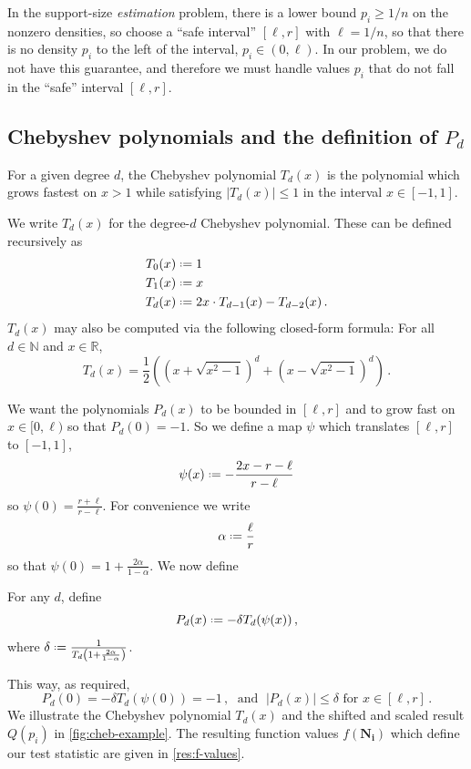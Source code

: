 \documentclass{theoretics}
\newcommand*{\define}{\mathrel{\vcenter{\baselineskip0.5ex \lineskiplimit0pt
                      \hbox{\scriptsize.}\hbox{\scriptsize.}}}%
                      =}
\newcommand{\bN}{\ensuremath{\mathbb{N}}}
\newcommand{\bR}{\ensuremath{\mathbb{R}}}
\begin{document}
\begin{remark}
In the support-size \emph{estimation} problem, there is a lower bound $p_i \geq 1/n$ on the
nonzero densities, so \cite{WY19} choose a ``safe interval'' $[\ell, r]$ with $\ell = 1/n$,
so that there is no density $p_i$ to the left of the interval, $p_i \in (0,\ell)$.
In our problem, we do not have this guarantee, and therefore we must handle values $p_i$ that do not
fall in the ``safe'' interval $[\ell, r]$.
\end{remark}

\subsection{Chebyshev polynomials and the definition of \texorpdfstring{$P_d$}{Pd}}
\label{section:chebyshev_polynomials}

For a given degree $d$, the Chebyshev polynomial $T_d(x)$ is the polynomial which grows fastest on
$x > 1$ while satisfying $|T_d(x)| \leq 1$ in the interval $x \in [-1,1]$.

\begin{definition}
We write $T_d(x)$ for the degree-$d$ Chebyshev polynomial. These can be defined recursively as
\begin{align*}
  T_0(x) &\define 1 \\
  T_1(x) &\define x \\
  T_d(x) &\define 2x \cdot T_{d-1}(x) - T_{d-2}(x) \,.
\end{align*}
$T_d(x)$ may also be computed via the following closed-form formula:
    \label{fact:chebyshev-formula}
    For all $d \in \bN$ and $x \in \bR$, 
    \[
        T_d(x)
        = \frac{1}{2} \left( \left(x + \sqrt{x^2-1}\right)^d
            + \left(x - \sqrt{x^2-1}\right)^d \right) \,.
    \]
\end{definition}

We want the polynomials $P_d(x)$ to be bounded in $[\ell, r]$ and to 
grow fast on $x \in [0,\ell)$ so that $P_d(0) = -1$. So we define a map $\psi$ which translates
$[\ell, r]$ to $[-1,1]$,
\[
  \psi(x) \define -\frac{2x - r - \ell}{r-\ell}
\]
so $\psi(0) = \frac{r+\ell}{r-\ell}$. For convenience we write
\[
  \alpha \define \frac{\ell}{r}
\]
so that $\psi(0) = 1 + \frac{2\alpha}{1-\alpha}$. We now define

\begin{definition}
For any $d$, define
\[
  P_d(x) \define - \delta T_d(\psi(x)) \,,
\]
where $\delta \define \frac{1}{T_d\left(1 + \frac{2\alpha}{1-\alpha}\right)}$.
\end{definition}
This way, as required,
\[
  P_d(0) = - \delta T_d(\psi(0)) = - 1 \,, \;\text{ and }\; |P_d(x)| \leq \delta \text{ for } x \in [\ell,
r] \,.
\]
We illustrate the Chebyshev polynomial $T_d(x)$ and the shifted and scaled result $Q(p_i)$
in \cref{fig:cheb-example}. The resulting function values $f(\bm{N_i})$ which define our test
statistic are given in \cref{res:f-values}.
\end{document}
